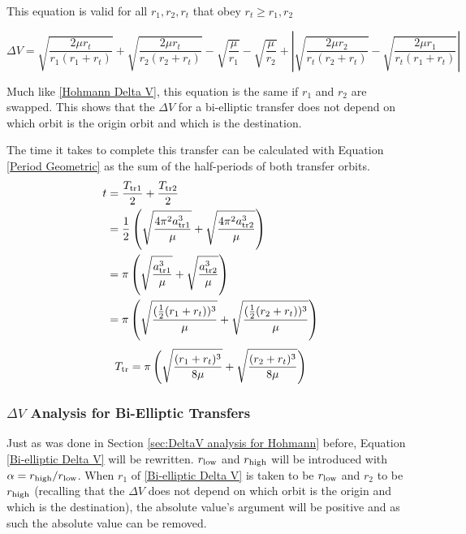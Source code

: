 \documentclass[../basicOrbitalDynamics.tex]{subfiles}
\begin{document}
This equation is valid for all $r_1, r_2, r_t$ that obey $r_t\geq r_1,r_2$

\begin{equation}\label{Bi-elliptic Delta V}
    \Delta V = \sqrt{\frac{2\mu r_t}{r_1(r_1+r_t)}}+\sqrt{\frac{2\mu r_t}{r_2(r_2+r_t)}}-\sqrt{\frac{\mu}{r_1}}-\sqrt{\frac{\mu}{r_2}}+\left|\sqrt{\frac{2\mu r_2}{r_t(r_2+r_t)}}-\sqrt{\frac{2\mu r_1}{r_t(r_1+r_t)}}\right|
\end{equation}

Much like  \eqref{Hohmann Delta V}, this equation is the same if $r_1$ and $r_2$ are swapped. This shows that the $\Delta V$ for a bi-elliptic transfer does not depend on which orbit is the origin orbit and which is the destination.

The time it takes to complete this transfer can be calculated with Equation  \eqref{Period Geometric} as the sum of the half-periods of both transfer orbits.
\begin{align*}
    t &=\frac{{T}_\text{tr1}}{2}+\frac{{T}_\text{tr2}}{2} \\
 &=\frac{1}{2}\left(\sqrt{\frac{4\pi^2 {a}_\text{tr1}^3}{\mu}}+\sqrt{\frac{4\pi^2 {a}_\text{tr2}^3}{\mu}}\right) \\
 &=\pi\left(\sqrt{\frac{{a}_\text{tr1}^3}{\mu}}+\sqrt{\frac{{a}_\text{tr2}^3}{\mu}}\right) \\
 &=\pi\left(\sqrt{\frac{(\frac{1}{2}(r_1+r_t))^3}{\mu}}+\sqrt{\frac{(\frac{1}{2}(r_2+r_t))^3}{\mu}}\right) \\
\end{align*}
\begin{equation}\label{Bielliptic time}
    {T}_\text{tr}=\pi\left(\sqrt{\frac{(r_1+r_t)^3}{8\mu}}+\sqrt{\frac{(r_2+r_t)^3}{8\mu}}\right)
\end{equation}

\subsubsection{\texorpdfstring{$\Delta V$}{DeltaV} Analysis for Bi-Elliptic Transfers}\label{sec:DeltaV Analsysis for bi-elliptic}

Just as was done in Section  \ref{sec:DeltaV analysis for Hohmann} before, Equation  \eqref{Bi-elliptic Delta V} will be rewritten. ${r}_\text{low}$ and ${r}_\text{high}$ will be introduced with $\alpha={r}_\text{high}/{r}_\text{low}$. When $r_1$ of  \eqref{Bi-elliptic Delta V} is taken to be ${r}_\text{low}$ and $r_2$ to be ${r}_\text{high}$ (recalling that the $\Delta V$ does not depend on which orbit is the origin and which is the destination), the absolute value's argument will be positive and as such the absolute value can be removed.
\end{document}
